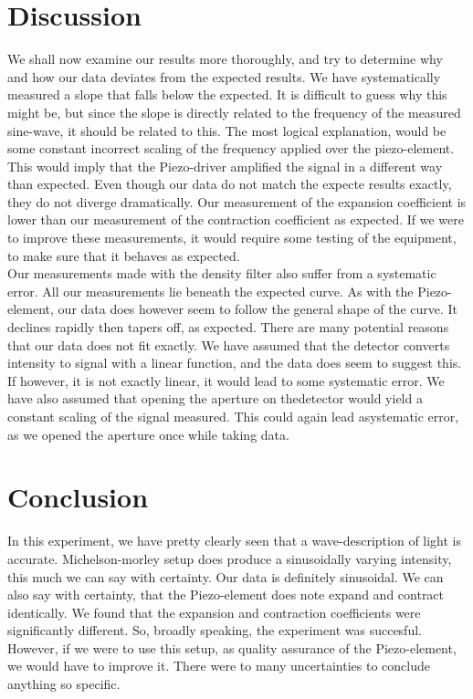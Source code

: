 \documentclass[working, oneside]{inputs/tuftebook}
\begin{document}
\section*{Discussion}
We shall now examine our results more thoroughly, and try to determine why and how our data deviates from the expected results. We have systematically measured a slope that falls below the expected. It is difficult to guess why this might be, but since the slope is directly related to the frequency of the measured sine-wave, it should be related to this. The most logical explanation, would be some constant incorrect scaling of the frequency applied over the piezo-element. This would imply that the Piezo-driver amplified the signal in a different way than expected. Even though our data do not match the expecte results exactly, they do not diverge dramatically. Our measurement of the expansion coefficient is lower than our measurement of the contraction coefficient as expected. If we were to improve these measurements, it would require some testing of the equipment, to make sure that it behaves as expected.  \\
Our measurements made with the density filter also suffer from a systematic error. All our measurements lie beneath the expected curve. As with the Piezo-element, our data does however seem to follow the general shape of the curve. It declines rapidly then tapers off, as expected. There are many potential reasons that our data does not fit exactly. We have assumed that the detector converts intensity to signal with a linear function, and the data does seem to suggest this. If however, it is not exactly linear, it would lead to some systematic error. We have also assumed that opening the aperture on thedetector would yield a constant scaling of the signal measured. This could again lead asystematic error, as we opened the aperture once while taking data. 
\section*{Conclusion}
In this experiment, we have pretty clearly seen that a wave-description of light is accurate. Michelson-morley setup does produce a sinusoidally varying intensity, this much we can say with certainty. Our data is definitely sinusoidal. We can also say with certainty, that the Piezo-element does note expand and contract identically. We found that the expansion and contraction coefficients were significantly different. So, broadly speaking, the experiment was succesful. However, if we were to use this setup, as quality assurance of the Piezo-element, we would have to improve it. There were to many uncertainties to conclude anything so specific.
\printbibliography
\end{document}

